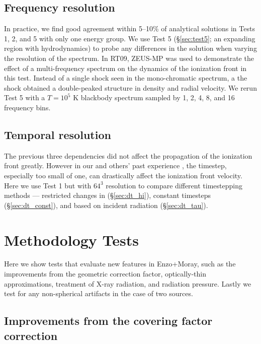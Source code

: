 \documentclass[12pt,preprint]{aastex}
\begin{document}
\subsection{Frequency resolution}

In practice, we find good agreement within 5--10\% of analytical
solutions in Tests 1, 2, and 5 with only one energy group.  We use
Test 5 (\S\ref{sec:test5}; an expanding  region with
hydrodynamics) to probe any differences in the solution when varying
the resolution of the spectrum.  In RT09, ZEUS-MP was used to
demonstrate the effect of a multi-frequency spectrum on the dynamics
of the ionization front in this test.  Instead of a single shock seen
in the mono-chromatic spectrum, a the shock obtained a double-peaked
structure in density and radial velocity.  We rerun Test 5 with a
$T=10^5$ K blackbody spectrum sampled by 1, 2, 4, 8, and 16 frequency
bins.

\subsection{Temporal resolution}
\label{sec:dt_dep}

The previous three dependencies did not affect the propagation of the
ionization front greatly.  However in our and others' past experience
\citep[e.g.][\bf{+others!}]{Petkova09}, the timestep, especially too
small of one, can drastically affect the ionization front velocity.
Here we use Test 1 but with $64^3$ resolution to compare different
timestepping methods --- restricted changes in 
(\S\ref{sec:dt_hi}), constant timesteps (\S\ref{sec:dt_const}), and
based on incident radiation (\S\ref{sec:dt_tau}).

\section{Methodology Tests}

Here we show tests that evaluate new features in Enzo+Moray, such as
the improvements from the geometric correction factor, optically-thin
approximations, treatment of X-ray radiation, and radiation pressure.
Lastly we test for any non-spherical artifacts in the case of two
sources.

\subsection{Improvements from the covering factor correction}
\label{sec:test_fc}
\end{document}
